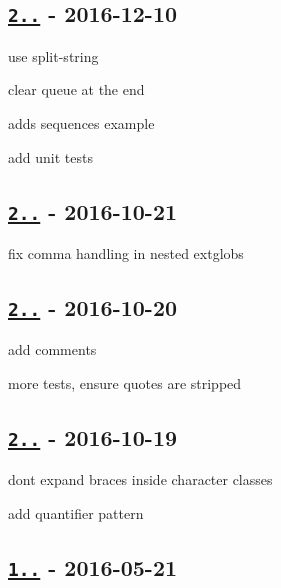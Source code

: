 \subsection*{\href{https://github.com/micromatch/braces/compare/2.0.2...2.0.3}{\tt 2..} -\/ 2016-\/12-\/10}


\begin{DoxyItemize}
\item use split-\/string
\item clear queue at the end
\item adds sequences example
\item add unit tests
\end{DoxyItemize}

\subsection*{\href{https://github.com/micromatch/braces/compare/2.0.1...2.0.2}{\tt 2..} -\/ 2016-\/10-\/21}


\begin{DoxyItemize}
\item fix comma handling in nested extglobs
\end{DoxyItemize}

\subsection*{\href{https://github.com/micromatch/braces/compare/2.0.0...2.0.1}{\tt 2..} -\/ 2016-\/10-\/20}


\begin{DoxyItemize}
\item add comments
\item more tests, ensure quotes are stripped
\end{DoxyItemize}

\subsection*{\href{https://github.com/micromatch/braces/compare/1.8.5...2.0.0}{\tt 2..} -\/ 2016-\/10-\/19}


\begin{DoxyItemize}
\item don\textquotesingle{}t expand braces inside character classes
\item add quantifier pattern
\end{DoxyItemize}

\subsection*{\href{https://github.com/micromatch/braces/compare/1.8.4...1.8.5}{\tt 1..} -\/ 2016-\/05-\/21}


